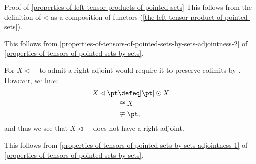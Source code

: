 \begin{Proof}{Proof of \cref{properties-of-left-tensor-products-of-pointed-sets}}%
    This follows from the definition of $\lhd$ as a composition of functors (\cref{the-left-tensor-product-of-pointed-sets}).

    This follows from \cref{properties-of-tensors-of-pointed-sets-by-sets-adjointness-2} of \cref{properties-of-tensors-of-pointed-sets-by-sets}.

    For $X\lhd -$ to admit a right adjoint would require it to preserve colimits by . However, we have
    \begin{align*}
        X\lhd\pt &\defeq |\pt|\odot X\\
                 &\cong  X\\
                 &\ncong \pt,
    \end{align*}
    and thus we see that $X\lhd -$ does not have a right adjoint.

    This follows from \cref{properties-of-tensors-of-pointed-sets-by-sets-adjointness-1} of \cref{properties-of-tensors-of-pointed-sets-by-sets}.
\end{Proof}
